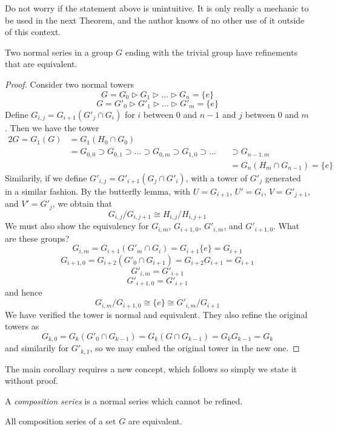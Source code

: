 Do not worry if the statement above is unintuitive. It is only really a mechanic to be used in the next Theorem, and the author knows of no other use of it outside of this context.

\begin{theorem}[Shreier]
    Two normal series in a group $G$ ending with the trivial group have refinements that are equivalent.
\end{theorem}
\begin{proof}
    Consider two normal towers
    \[ G = G_0 \rhd G_1 \rhd \dots \rhd G_n = \{ e \} \]
    \[ G = G'_0 \rhd G'_1 \rhd \dots \rhd G'_m = \{ e \} \]
    Define $G_{i,j} = G_{i+1}(G'_j \cap G_i)$ for $i$ between 0 and $n-1$ and $j$ between 0 and $m$. Then we have the tower
    \begin{alignat*}{2}
    G = G_1(G) &= G_1(H_0 \cap G_0) &\\
               &= G_{0,0} \supset G_{0,1} \supset \dots \supset G_{0,m} \supset G_{1,0} \supset \dots &&\supset G_{n-1,m}\\
                &           &&= G_n(H_m \cap G_{n-1}) = \{ e \}
    \end{alignat*}
    Similarily, if we define $G'_{i,j} = G'_{i+1}(G_j \cap G'_i)$, with a tower of $G'_j$ generated in a similar fashion. By the butterfly lemma, with $U = G_{i+1}$, $U' = G_i$, $V = G'_{j+1}$, and $V' = G'_j$, we obtain that
    \[ G_{i,j}/G_{i,j+1} \cong H_{i,j}/H_{i,j+1} \]
    We must also show the equivalency for $G_{i,m}$, $G_{i+1,0}$, $G'_{i,m}$, and $G'_{i+1,0}$. What are these groups?
    \[ G_{i,m} = G_{i+1}(G'_m \cap G_i) = G_{i+1}\{e\} = G_{i+1} \]
    \[ G_{i+1,0} = G_{i+2}(G'_0 \cap G_{i+1}) = G_{i+2}G_{i+1} = G_{i+1} \]
    \[ G'_{i,m} = G'_{i+1} \]
    \[ G'_{i+1,0} = G'_{i+1} \]
    and hence
    \[ G_{i,m}/G_{i+1,0} \cong \{e\} \cong G'_{i,m}/G_{i+1} \]
    We have verified the tower is normal and equivalent. They also refine the original towers as
    \[ G_{k,0} = G_k(G'_0 \cap G_{k-1}) = G_k(G \cap G_{k-1}) = G_kG_{k-1} = G_k \]
    and similarily for $G'_{k,1}$, so we may embed the original tower in the new one.
\end{proof}

The main corollary requires a new concept, which follows so simply we state it without proof.

A \emph{composition series} is a normal series which cannot be refined.

\begin{corollary}
    All composition series of a set $G$ are equivalent.
\end{corollary}

